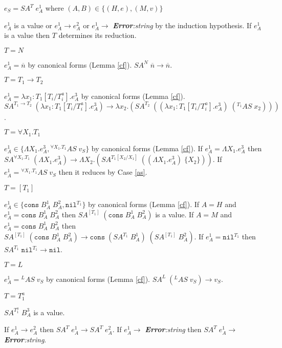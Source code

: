 \begin{case}
$e_{S}=SA^{T}\;e_{A}^{1}$ where $(A,B)\in\lbrace(H,e),(M,v)\rbrace$

$e_{A}^{1}$ is a value or $e_{A}^{1}\rightarrow e_{A}^{2}$ or $e_{A}^{1}\rightarrow$ \emph{\textbf{Error}:\;string} by the induction hypothesis.  If $e_{A}^{1}$ is a value then $T$ determines its reduction.
\begin{subcase}
$T=N$

$e_{A}^{1}=\overline{n}$ by canonical forms (Lemma \ref{cf}).  $SA^{N}\;\overline{n}\rightarrow\overline{n}$.
\end{subcase}
\begin{subcase}
$T=T_{1}\rightarrow T_{2}$

$e_{A}^{1}=\lambda x_{1}:T_{1}[T_{i}/T_{i}^{a}].e_{A}^{3}$ by canonical forms (Lemma \ref{cf}).  $SA^{T_{1}\rightarrow T_{2}}\;(\lambda x_{1}:T_{1}[T_{i}/T_{i}^{a}].e_{A}^{3})\rightarrow\lambda x_{2}.(SA^{T_{2}}\;((\lambda x_{1}:T_{1}[T_{i}/T_{i}^{a}].e_{A}^{3})\;(^{T_{1}}AS\;x_{2})))$.
\end{subcase}
\begin{subcase}
$T=\forall X_{1}.T_{1}$

$e_{A}^{1}\in\lbrace\Lambda X_{1}.e_{A}^{3},{^{\forall X_{1}.T_{1}}A}S\;v_{S}\rbrace$ by canonical forms (Lemma \ref{cf}).  If $e_{A}^{1}=\Lambda X_{1}.e_{A}^{3}$ then $SA^{\forall X_{1}.T_{1}}\;(\Lambda X_{1}.e_{A}^{3})\rightarrow\Lambda X_{2}.(SA^{T_{1}[X_{2}/X_{1}]}\;((\Lambda X_{1}.e_{A}^{3})\;\lbrace X_{2}\rbrace))$.  If $e_{A}^{1}={^{\forall X_{1}.T_{1}}A}S\;v_{S}$ then it reduces by Case \ref{as}.
\end{subcase}
\begin{subcase}
$T=[T_{1}]$

$e_{A}^{1}\in\lbrace\mathtt{cons}\;B_{A}^{1}\;B_{A}^{2},\mathtt{nil}^{T_{1}}\rbrace$ by canonical forms (Lemma \ref{cf}).  If $A=H$ and $e_{A}^{1}=\mathtt{cons}\;B_{A}^{1}\;B_{A}^{2}$ then $SA^{[T_{1}]}\;(\mathtt{cons}\;B_{A}^{1}\;B_{A}^{2})$ is a value.  If $A=M$ and $e_{A}^{1}=\mathtt{cons}\;B_{A}^{1}\;B_{A}^{2}$ then $SA^{[T_{1}]}\;(\mathtt{cons}\;B_{A}^{1}\;B_{A}^{2})\rightarrow\mathtt{cons}\;(SA^{T_{1}}\;B_{A}^{1})\;(SA^{[T_{1}]}\;B_{A}^{2})$.  If $e_{A}^{1}=\mathtt{nil}^{T_{1}}$ then $SA^{T_{1}}\;\mathtt{nil}^{T_{1}}\rightarrow\mathtt{nil}$.
\end{subcase}
\begin{subcase}
$T=L$

$e_{A}^{1}={^{L}A}S\;v_{S}$ by canonical forms (Lemma \ref{cf}).  $SA^{L}\;(^{L}AS\;v_{S})\rightarrow v_{S}$.
\end{subcase}
\begin{subcase}
$T=T_{1}^{a}$

$SA^{T_{1}^{a}}\;B_{A}^{3}$ is a value.
\end{subcase}
If $e_{A}^{1}\rightarrow e_{A}^{2}$ then $SA^{T}\;e_{A}^{1}\rightarrow SA^{T}\;e_{A}^{2}$.  If $e_{A}^{1}\rightarrow$ \emph{\textbf{Error}:\;string} then $SA^{T}\;e_{A}^{1}\rightarrow$ \emph{\textbf{Error}:\;string}.
\end{case}